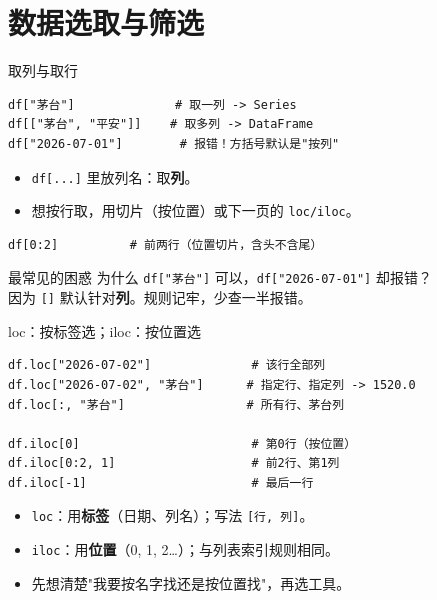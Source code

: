 \documentclass[9pt]{ctexbeamer}
\begin{document}
\section{数据选取与筛选}

\begin{frame}[fragile]{取列与取行}
	\begin{lstlisting}
df["茅台"]              # 取一列 -> Series
df[["茅台", "平安"]]    # 取多列 -> DataFrame
df["2026-07-01"]        # 报错！方括号默认是"按列"
\end{lstlisting}
	\begin{itemize}
		\item \texttt{df[...]} 里放列名：取\textbf{列}。
		\item 想按行取，用切片（按位置）或下一页的 \texttt{loc/iloc}。
	\end{itemize}
	\begin{lstlisting}
df[0:2]          # 前两行（位置切片，含头不含尾）
\end{lstlisting}
	\begin{alertblock}{最常见的困惑}
		为什么 \texttt{df["茅台"]} 可以，\texttt{df["2026-07-01"]} 却报错？\\
		因为 \texttt{[]} 默认针对\textbf{列}。规则记牢，少查一半报错。
	\end{alertblock}
\end{frame}

\begin{frame}[fragile]{loc：按标签选；iloc：按位置选}
	\begin{lstlisting}
df.loc["2026-07-02"]              # 该行全部列
df.loc["2026-07-02", "茅台"]      # 指定行、指定列 -> 1520.0
df.loc[:, "茅台"]                 # 所有行、茅台列

df.iloc[0]                        # 第0行（按位置）
df.iloc[0:2, 1]                   # 前2行、第1列
df.iloc[-1]                       # 最后一行
\end{lstlisting}
	\begin{itemize}
		\item \texttt{loc}：用\textbf{标签}（日期、列名）；写法 \texttt{[行, 列]}。
		\item \texttt{iloc}：用\textbf{位置}（0, 1, 2\ldots）；与列表索引规则相同。
		\item \alert{先想清楚"我要按名字找还是按位置找"，再选工具}。
	\end{itemize}
\end{frame}
\end{document}
